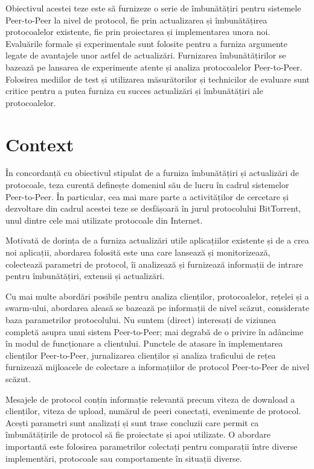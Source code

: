 Obiectivul acestei teze este să furnizeze o serie de îmbunătățiri pentru
sistemele Peer-to-Peer la nivel de protocol, fie prin actualizarea și
îmbunătățirea protocoalelor existente, fie prin proiectarea și implementarea
unora noi. Evaluările formale și experimentale sunt folosite pentru a furniza
argumente legate de avantajele unor astfel de actualizări. Furnizarea
îmbunătățirilor se bazează pe lansarea de experimente atente și analiza
protocoalelor Peer-to-Peer. Folosirea mediilor de test și utilizarea
măsurătorilor și technicilor de evaluare sunt critice pentru a putea furniza
cu succes actualizări și îmbunătățiri ale protocoalelor.

\section{Context}
\label{sec:intro:scope}

În concordanță cu obiectivul stipulat de a furniza îmbunătățiri și actualizări
de protocoale, teza curentă definește domeniul său de lucru în
cadrul sistemelor Peer-to-Peer. În particular, cea mai mare parte a
activităților de cercetare și dezvoltare din cadrul acestei teze se desfășoară
în jurul protocolului BitTorrent, unul dintre cele mai utilizate protocoale
din Internet.

Motivată de dorința de a furniza actualizări utile aplicațiilor existente și
de a crea noi aplicații, abordarea folosită este una care lansează și
monitorizează, colectează parametri de protocol, îi analizează și furnizează
informații de intrare pentru îmbunătățiri, extensii și actualizări.

Cu mai multe abordări posibile pentru analiza clienților, protocoalelor,
rețelei și a swarm-ului, abordarea aleasă se bazează pe informații de nivel
scăzut, considerate baza parametrilor protocolului. Nu suntem (direct)
interesați de viziunea completă asupra unui sistem Peer-to-Peer; mai degrabă
de o privire în adâncime în modul de funcționare a clientului. Punctele de
atasare în implementarea clienților Peer-to-Peer, jurnalizarea clienților și
analiza traficului de rețea furnizează mijloacele de colectare a informațiilor
de protocol Peer-to-Peer de nivel scăzut.

Mesajele de protocol conțin informație relevantă precum viteza de download a
clienților, viteza de upload, numărul de peeri conectați, evenimente de
protocol. Acești parametri sunt analizați și sunt trase concluzii care permit
ca îmbunătățirile de protocol să fie proiectate și apoi utilizate. O abordare
importantă este folosirea parametrilor colectați pentru comparații între
diverse implementări, protocoale sau comportamente în situații diverse.

